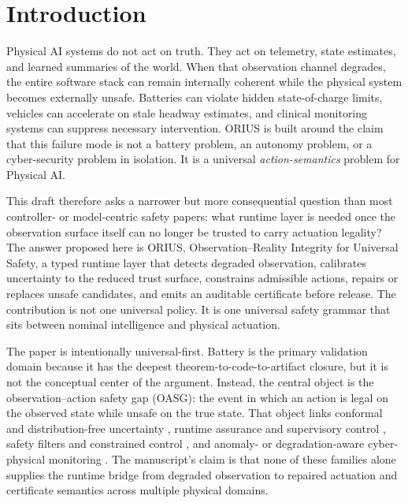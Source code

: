 \section{Introduction}
\label{sec:ieee-introduction}

Physical AI systems do not act on truth. They act on telemetry, state estimates, and
learned summaries of the world. When that observation channel degrades, the entire
software stack can remain internally coherent while the physical system becomes
externally unsafe. Batteries can violate hidden state-of-charge limits, vehicles can
accelerate on stale headway estimates, and clinical monitoring systems can suppress
necessary intervention. ORIUS is built around the claim that this failure
mode is not a battery problem, an autonomy problem, or a cyber-security problem in
isolation. It is a universal \emph{action-semantics} problem for Physical AI.

This draft therefore asks a narrower but more consequential question than most
controller- or model-centric safety papers: what runtime layer is needed once the
observation surface itself can no longer be trusted to carry actuation legality? The
answer proposed here is ORIUS, Observation--Reality Integrity for Universal Safety, a
typed runtime layer that detects degraded observation, calibrates uncertainty to the
reduced trust surface, constrains admissible actions, repairs or replaces unsafe
candidates, and emits an auditable certificate before release. The contribution is not
one universal policy. It is one universal safety grammar that sits between nominal
intelligence and physical actuation.

The paper is intentionally universal-first. Battery is the primary validation domain
because it has the deepest theorem-to-code-to-artifact closure, but it is not the
conceptual center of the argument. Instead, the central object is the
observation--action safety gap (OASG): the event in which an action is legal on the
observed state while unsafe on the true state. That object links conformal and
distribution-free uncertainty
\cite{vovk2005algorithmic,romano2019conformalized,gibbs2021adaptive,angelopoulos2023gentle,barber2023beyond,kiyani2025decision},
runtime assurance and supervisory control
\cite{sha2001using,sha1998simplex,desai2019soter,bartocci2018introduction,leucker2009brief,kwon2025adaptive},
safety filters and constrained control
\cite{ames2019control,wabersich2021predictive,fisac2019general,ben2009robust},
and anomaly- or degradation-aware cyber-physical monitoring
\cite{rajkumar2010cps,teixeira2015secure,basseville1993detection,pasqualetti2013attack}.
The manuscript's claim is that none of these families alone supplies the runtime bridge
from degraded observation to repaired actuation and certificate semantics across
multiple physical domains.

